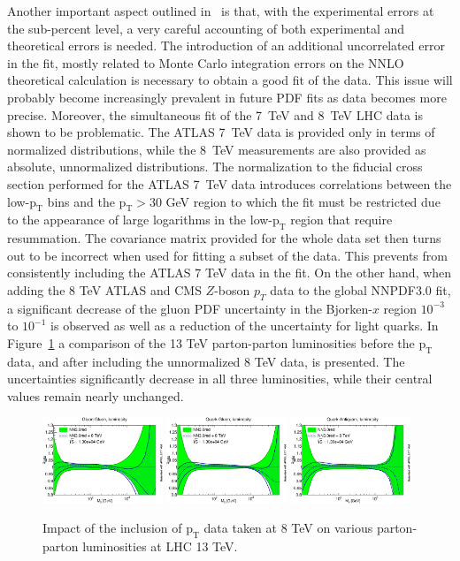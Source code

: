 \documentclass[a4paper,11pt,notoc]{article}
\newcommand{\pt}{\ensuremath{\mathrm{p_T}}}
\begin{document}
Another important aspect outlined in~\cite{Boughezal:2017nla} is that, 
with the experimental errors at the sub-percent level, a very careful 
accounting of both experimental and theoretical errors is needed. 
The introduction of an additional uncorrelated error in the fit, 
mostly related to Monte Carlo integration errors on the NNLO theoretical  
calculation is necessary to obtain a good fit of the data. 
This issue will probably become increasingly prevalent in future PDF 
fits as data becomes more precise.
%
Moreover, the simultaneous fit of the 7~TeV and 8~TeV LHC data is shown to 
be problematic. 
The ATLAS 7~TeV data is provided only in terms of normalized distributions, 
while the 8~TeV measurements are also provided as absolute, unnormalized 
distributions. The normalization to the fiducial cross section performed 
for the ATLAS 7~TeV data introduces correlations between the low-$\pt$ 
bins and the $\pt>30$ GeV region to which the fit must be restricted due 
to the appearance of large logarithms in the low-$\pt$ region that require 
resummation.  
The covariance matrix provided for the whole data set then turns 
out to be incorrect when used for fitting a subset of the data. 
This prevents from consistently including the ATLAS 7 TeV data in the fit.
% 
On the other hand, when adding the 8 TeV ATLAS and CMS $Z$-boson $p_T$ data 
to the global NNPDF3.0 fit, a significant decrease of the gluon PDF 
uncertainty in the Bjorken-$x$ region $10^{-3}$ to $10^{-1}$ is observed
as well as a reduction of the uncertainty for light quarks.
In Figure~\ref{fig:lumi} a comparison of the 13 TeV parton-parton luminosities 
before the $\pt$ data, and after including the unnormalized 8 TeV data, 
is presented. The uncertainties significantly decrease in all three luminosities, 
while their central values remain nearly unchanged.
%
\begin{figure}[tbp]
        \centering
        \includegraphics[width=0.32\textwidth]{lumiGG_baselineP8tev.eps}
        \includegraphics[width=0.32\textwidth]{lumiQG_baselineP8tev.eps} 
        \includegraphics[width=0.32\textwidth]{lumiQQ_baselineP8tev.eps} 
        \caption{Impact of the inclusion of $\pt$ data taken at 8 TeV on
various parton-parton luminosities at LHC 13 TeV.\label{fig:lumi}}
\end{figure}
\end{document}
